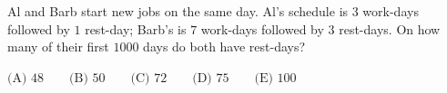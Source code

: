 Al and Barb start new jobs on the same day. Al's schedule is $3$ work-days followed by $1$ rest-day; Barb's is $7$ work-days followed by $3$ rest-days. On how many of their first $1000$ days do both have rest-days?

$\text{(A) } 48\qquad\text{(B) } 50\qquad\text{(C) } 72\qquad\text{(D) } 75\qquad\text{(E) } 100$
